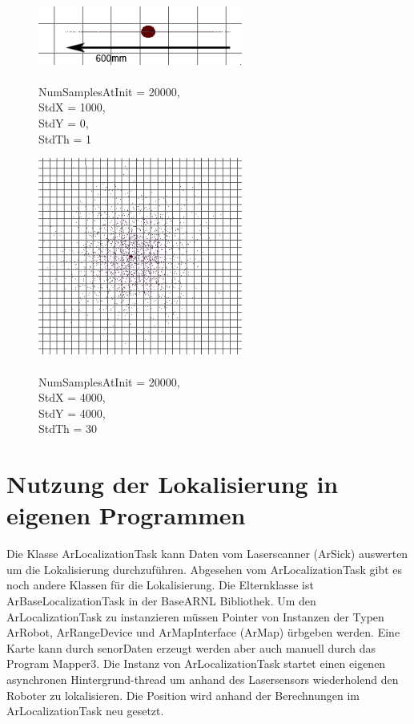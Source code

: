 \documentclass{article}
\begin{document}
\begin{figure}
	\centering
	\includegraphics[width=0.6\textwidth]{img/stdx1000stdy0stdth1.png}
	\caption{\\ NumSamplesAtInit = 20000, \\ StdX = 1000,\\ StdY = 0,\\ StdTh = 1}
	\label{stdx1000stdy0stdth1Test}
\end{figure}

\begin{figure}
	\centering
	\includegraphics[width=0.6\textwidth]{img/stdx4000stdy4000stdth30.png}
	\caption{\\ NumSamplesAtInit = 20000, \\ StdX = 4000,\\ StdY = 4000,\\ StdTh = 30}
	\label{stdx4000stdy4000stdth30}
\end{figure}

\newpage
\newpage
\section{Nutzung der Lokalisierung in eigenen Programmen}\label{eigenes}

 Die Klasse ArLocalizationTask kann Daten vom Laserscanner (ArSick) auswerten um die Lokalisierung durchzuf\"uhren. Abgesehen vom ArLocalizationTask gibt es noch andere Klassen f\"ur die Lokalisierung. Die Elternklasse ist ArBaseLocalizationTask in der BaseARNL Bibliothek. \cite{arnl}
Um den ArLocalizationTask zu instanzieren m\"ussen Pointer von Instanzen der Typen ArRobot, ArRangeDevice und ArMapInterface (ArMap) \"urbgeben werden. Eine Karte kann durch senorDaten erzeugt werden aber auch manuell durch das Program Mapper3. Die Instanz von ArLocalizationTask startet einen eigenen asynchronen Hintergrund-thread um anhand des Lasersensors wiederholend den Roboter zu lokalisieren. Die Position wird anhand der Berechnungen im ArLocalizationTask neu gesetzt.
\end{document}
